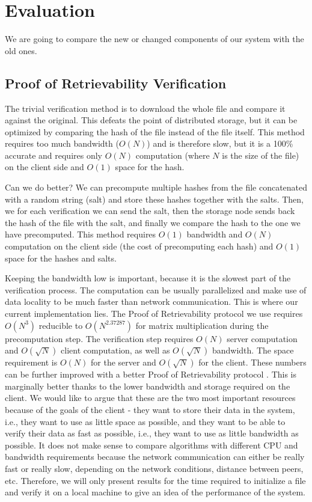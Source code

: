 \chapter{Evaluation}
\label{chap:evaluation}

We are going to compare the new or changed components of our system with the old ones.

\section{Proof of Retrievability Verification}

The trivial verification method is to download the whole file and compare it against the original.
This defeats the point of distributed storage, but it can be optimized by comparing the hash of the file instead of the file itself.
This method requires too much bandwidth ($O(N)$) and is therefore slow,
but it is a 100\% accurate and requires only $O(N)$ computation (where $N$ is the size of the file) on the client side and $O(1)$ space for the hash.

Can we do better?
We can precompute multiple hashes from the file concatenated with a random string (salt) and store these hashes together with the salts.
Then, we for each verification we can send the salt, then the storage node sends back the hash of the file with the salt, and finally we compare the hash to the one we have precomputed.
This method requires $O(1)$ bandwidth and $O(N)$ computation on the client side (the cost of precomputing each hash) and $O(1)$ space for the hashes and salts.

Keeping the bandwidth low is important, because it is the slowest part of the verification process.
The computation can be usually parallelized and make use of data locality to be much faster than network communication.
This is where our current implementation lies.
The Proof of Retrievability protocol we use requires $O(N^3)$ reducible to $O(N^{2.37287})$ \cite{matrixmultiplication} for matrix multiplication during the precomputation step.
The verification step requires $O(N)$ server computation and $O(\sqrt{N})$ client computation, as well as $O(\sqrt{N})$ bandwidth.
The space requirement is $O(N)$ for the server and $O(\sqrt{N})$ for the client.
These numbers can be further improved with a better Proof of Retrievability protocol \cite{pormerkle}.
This is marginally better thanks to the lower bandwidth and storage required on the client.
We would like to argue that these are the two most important resources because of the goals of the client - they want to store their data in the system, i.e., they want to use as little space as possible, and they want to be able to verify their data as fast as possible, i.e., they want to use as little bandwidth as possible.
It does not make sense to compare algorithms with different CPU and bandwidth requirements because the network communication can either be really fast or really slow, depending on the network conditions, distance between peers, etc.
Therefore, we will only present results for the time required to initialize a file and verify it on a local machine to give an idea of the performance of the system.



